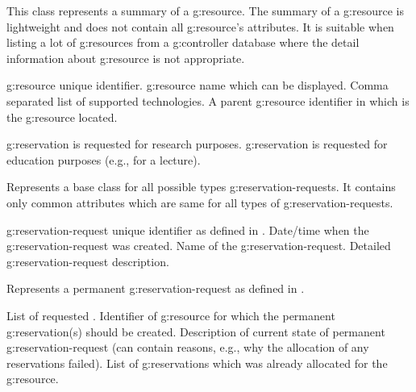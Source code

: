 \begin{Api}
This class represents a summary of a \gls{g:resource}. The summary of a \gls{g:resource} is lightweight and does not contain all \gls{g:resource}'s attributes. It is suitable when listing a lot of \glspl{g:resource} from a \gls{g:controller} database where the detail information about \gls{g:resource} is not appropriate.
\begin{ApiClassAttributes}
 \Gls{g:resource} unique identifier.
 \Gls{g:resource} name which can be displayed.
 Comma separated list of supported technologies.
 A parent \gls{g:resource} identifier in which is the \gls{g:resource} located.
\end{ApiClassAttributes}

\begin{ApiEnumValues}
 \Gls{g:reservation} is requested for research purposes.
 \Gls{g:reservation} is requested for education purposes (e.g., for a lecture).
\end{ApiEnumValues}

Represents a base class for all possible types \glspl{g:reservation-request}. It contains only common attributes which are same for all types of \glspl{g:reservation-request}.
\begin{ApiClassAttributes}
 \Gls{g:reservation-request} unique identifier as defined in .
 Date/time when the \gls{g:reservation-request} was created.
 Name of the \gls{g:reservation-request}.
 Detailed \gls{g:reservation-request} description.
\end{ApiClassAttributes}

Represents a permanent \gls{g:reservation-request} as defined in .
\begin{ApiClassAttributes}
 List of requested .
 Identifier of \gls{g:resource} for which the permanent \gls{g:reservation}(s) should be created. 
 Description of current state of permanent \gls{g:reservation-request} (can contain reasons, e.g., why the allocation of any reservations failed).
 List of \glspl{g:reservation} which was already allocated for the \gls{g:resource}.
\end{ApiClassAttributes}


\end{Api}

